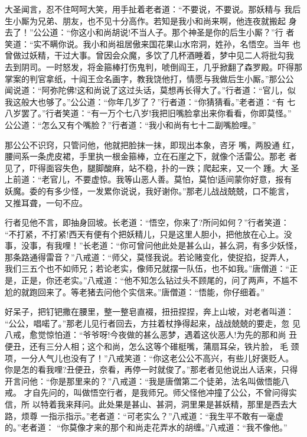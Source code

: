 大圣闻言，忍不住呵呵大笑，用手扯着老者道：“不要说，不要说。那妖精与
我后生小厮为兄弟、朋友，也不见十分高作。若知是我小和尚来啊，他连夜就搬起
身去了！”公公道：“你这小和尚胡说!不当人子。那个神圣是你的后生小厮？”行
者笑道：“实不瞒你说。我小和尚祖居傲来国花果山水帘洞，姓孙，名悟空。当年
也曾做过妖精，干过大事。曾因会众魔，多饮了几杯酒睡着，梦中见二人将批勾我
去到阴司。一时怒发，将金箍棒打伤鬼判，唬倒阎王，几乎掀翻了森罗殿。吓得那
掌案的判官拿纸，十阎王佥名画字，教我饶他打，情愿与我做后生小厮。”那公公
闻说道：“阿弥陀佛!这和尚说了这过头话，莫想再长得大了。”行者道：“官儿，似
我这般大也够了。”公公道：“你年几岁了？”行者道：“你猜猜看。”老者道：“有
七八岁罢了。”行者笑道：“有一万个七八岁!我把旧嘴脸拿出来你看看，你即莫怪。”
公公道：“怎么又有个嘴脸？”行者道：“我小和尚有七十二副嘴脸哩。”

那公公不识窍，只管问他，他就把脸抹一抹，即现出本象，咨牙嘴，两股通
红，腰间系一条虎皮裙，手里执一根金箍棒，立在石崖之下，就像个活雷公。那老
者见了，吓得面容失色，腿脚酸麻，站不稳，扑的一跌；爬起来，又一个踵。大
圣上前道：“老官儿，不要虚惊。我等山恶人善。莫怕，莫怕!适间蒙你好意，报有
妖魔。委的有多少怪，一发累你说说，我好谢你。”那老儿战战兢兢，口不能言，
又推耳聋，一句不应。

行者见他不言，即抽身回坡。长老道：“悟空，你来了?所问如何？”行者笑道：
“不打紧，不打紧!西天有便有个把妖精儿，只是这里人胆小，把他放在心上。没
事，没事，有我哩！”长老道：“你可曾问他此处是甚么山，甚么洞，有多少妖怪，
那条路通得雷音？”八戒道：“师父，莫怪我说。若论赌变化，使捉掐，捉弄人，
我们三五个也不如师兄；若论老实，像师兄就摆一队伍，也不如我。”唐僧道：“正
是，正是，你还老实。”八戒道：“他不知怎么钻过头不顾尾的，问了两声，不尴不
尬的就跑回来了。等老猪去问他个实信来。”唐僧道：“悟能，你仔细着。”

好呆子，把钉钯撒在腰里，整一整皂直裰，扭扭捏捏，奔上山坡，对老者叫道：
“公公，唱喏了。”那老儿见行者回去，方拄着杖挣得起来，战战兢兢的要走，忽
见八戒，愈觉惊怕道：“爷爷呀!今夜做的甚么恶梦，遇着这伙恶人!为先的那和尚
丑便丑，还有三分人相；这个和尚，怎么这等个碓梃嘴，蒲扇耳朵，铁片脸，毛
颈项，一分人气儿也没有了！”八戒笑道：“你这老公公不高兴，有些儿好褒贬人。
你是怎的看我哩?丑便丑，奈看，再停一时就俊了。”那老者见他说出人话来，只得
开言问他：“你是那里来的？”八戒道：“我是唐僧第二个徒弟，法名叫做悟能八戒。
才自先问的，叫做悟空行者，是我师兄。师父怪他冲撞了公公，不曾问得实信，所
以特着我来拜问。此处果是甚山、甚洞，洞里果是甚妖精，那里是西去大路，烦尊
一指示指示。”老者道：“可老实么？”八戒道：“我生平不敢有一毫虚的。”老者道：
“你莫像才来的那个和尚走花弄水的胡缠。”八戒道：“我不像他。”

